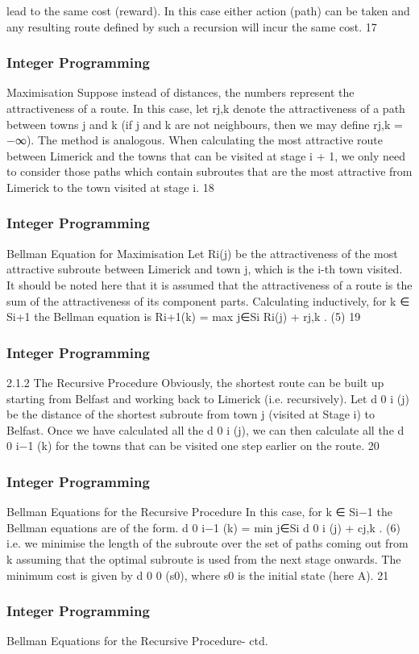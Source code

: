 \begin{frame}
lead to the same cost (reward).
In this case either action (path) can be taken and any resulting
route defined by such a recursion will incur the same cost.
17 \end{frame}  \begin{frame} \frametitle{Integer Programming}     
Maximisation
Suppose instead of distances, the numbers represent the
attractiveness of a route.
In this case, let rj,k denote the attractiveness of a path between
towns j and k (if j and k are not neighbours, then we may define
rj,k = −∞).
The method is analogous. When calculating the most attractive
route between Limerick and the towns that can be visited at stage
i + 1, we only need to consider those paths which contain
subroutes that are the most attractive from Limerick to the town
visited at stage i.
18 \end{frame}  \begin{frame} \frametitle{Integer Programming}     
Bellman Equation for Maximisation
Let Ri(j) be the attractiveness of the most attractive subroute
between Limerick and town j, which is the i-th town visited.
It should be noted here that it is assumed that the attractiveness
of a route is the sum of the attractiveness of its component parts.
Calculating inductively, for k ∈ Si+1 the Bellman equation is
Ri+1(k) = max
j∈Si
{Ri(j) + rj,k }. (5)
19 \end{frame}  \begin{frame} \frametitle{Integer Programming}     
2.1.2 The Recursive Procedure
Obviously, the shortest route can be built up starting from Belfast
and working back to Limerick (i.e. recursively).
Let d
0
i
(j) be the distance of the shortest subroute from town j
(visited at Stage i) to Belfast.
Once we have calculated all the d
0
i
(j), we can then calculate all the
d
0
i−1
(k) for the towns that can be visited one step earlier on the
route.
20 \end{frame}  \begin{frame} \frametitle{Integer Programming}     
Bellman Equations for the Recursive Procedure
In this case, for k ∈ Si−1 the Bellman equations are of the form.
d
0
i−1
(k) = min
j∈Si
{d
0
i
(j) + cj,k }. (6)
i.e. we minimise the length of the subroute over the set of paths
coming out from k assuming that the optimal subroute is used
from the next stage onwards. The minimum cost is given by
d
0
0
(s0), where s0 is the initial state (here A).
21 \end{frame}  \begin{frame} \frametitle{Integer Programming}     
Bellman Equations for the Recursive Procedure- ctd.

\end{frame}
